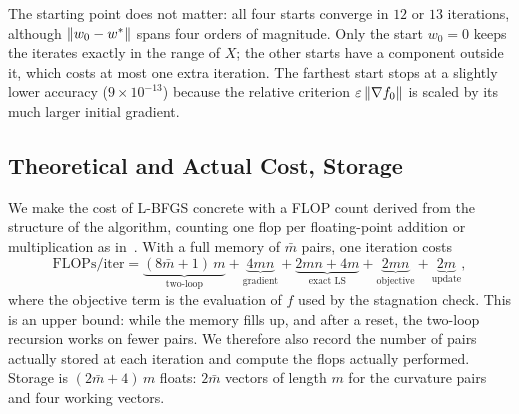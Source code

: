 \noindent The starting point does not matter: all four starts converge in $12$ or
$13$ iterations, although $\left\|w_0 - w^*\right\|$ spans four orders of magnitude.
Only the start $w_0 = 0$ keeps the iterates exactly in the range of $X$; the
other starts have a component outside it, which costs at most one extra
iteration. The farthest start stops at a slightly lower accuracy
($9 \times 10^{-13}$) because the relative criterion
$\varepsilon\left\|\nabla f_0\right\|$ is scaled by its much larger initial gradient.


\subsection{Theoretical and Actual Cost, Storage}
\label{sec:exp_cost}

\noindent We make the cost of L-BFGS concrete with a FLOP count derived from the
structure of the algorithm, counting one flop per floating-point addition or
multiplication as in~\cite{golub2013}. With a full memory of $\bar{m}$
pairs, one iteration costs
\[
  \text{FLOPs/iter} = \underbrace{(8\bar{m} + 1)\,m}_{\text{two-loop}}
                    + \underbrace{4mn}_{\text{gradient}}
                    + \underbrace{2mn + 4m}_{\text{exact LS}}
                    + \underbrace{2mn}_{\text{objective}}
                    + \underbrace{2m}_{\text{update}},
\]
where the objective term is the evaluation of $f$ used by the stagnation
check. This is an upper bound: while the memory fills up, and after a reset,
the two-loop recursion works on fewer pairs. We therefore also record the
number of pairs actually stored at each iteration and compute the flops
actually performed. Storage is $(2\bar{m} + 4)\,m$ floats: $2\bar m$ vectors
of length $m$ for the curvature pairs and four working vectors.

